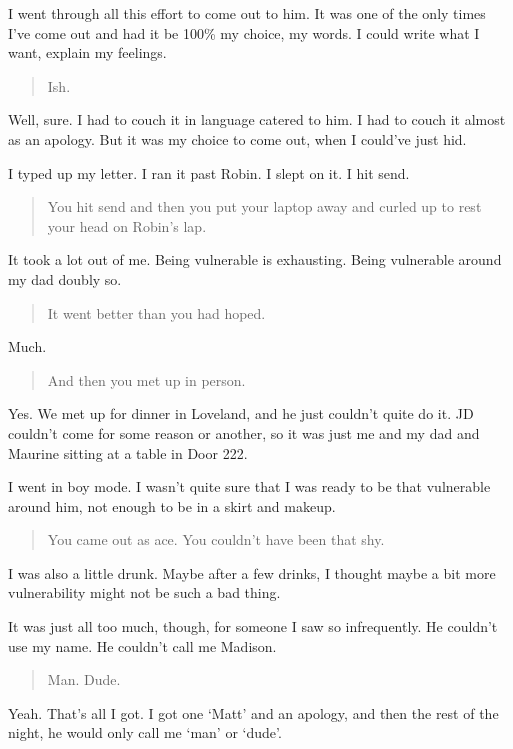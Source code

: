 I went through all this effort to come out to him. It was one of the only times I've come out and had it be 100\% my choice, my words. I could write what I want, explain my feelings.

\begin{quote}
Ish.
\end{quote}

Well, sure. I had to couch it in language catered to him. I had to couch it almost as an apology. But it was my choice to come out, when I could've just hid.

I typed up my letter. I ran it past Robin. I slept on it. I hit send.

\begin{quote}
You hit send and then you put your laptop away and curled up to rest your head on Robin's lap.
\end{quote}

It took a lot out of me. Being vulnerable is exhausting. Being vulnerable around my dad doubly so.

\begin{quote}
It went better than you had hoped.
\end{quote}

Much.

\begin{quote}
And then you met up in person.
\end{quote}

Yes. We met up for dinner in Loveland, and he just couldn't quite do it. JD couldn't come for some reason or another, so it was just me and my dad and Maurine sitting at a table in Door 222.

I went in boy mode. I wasn't quite sure that I was ready to be that vulnerable around him, not enough to be in a skirt and makeup.

\begin{quote}
You came out as ace. You couldn't have been that shy.
\end{quote}

I was also a little drunk. Maybe after a few drinks, I thought maybe a bit more vulnerability might not be such a bad thing.

It was just all too much, though, for someone I saw so infrequently. He couldn't use my name. He couldn't call me Madison.

\begin{quote}
Man. Dude.
\end{quote}

Yeah. That's all I got. I got one `Matt' and an apology, and then the rest of the night, he would only call me `man' or `dude'.

